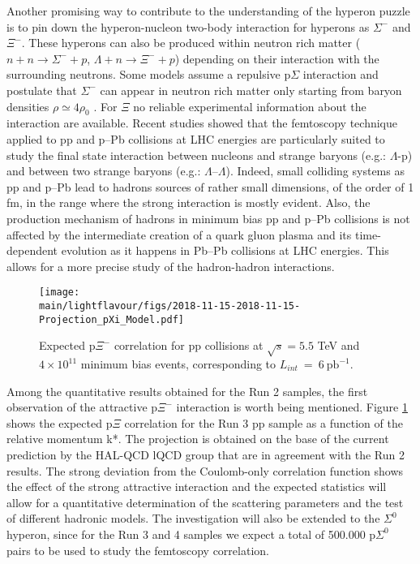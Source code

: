 Another promising way to contribute to the understanding of the hyperon puzzle is to pin down the hyperon-nucleon two-body interaction
for  hyperons as $\Sigma^{-}$ and $\Xi^-$. These hyperons can also be produced within neutron rich matter 
($n+n \rightarrow \Sigma^- + p$, $\Lambda +n \rightarrow \Xi^- +  p$) depending on their interaction with the surrounding neutrons.
Some models assume a repulsive p$\Sigma$ interaction and postulate that $\Sigma^{-}$ can appear in neutron rich matter only starting from baryon densities $\rho \simeq 4\rho_{0}$ \cite{PRC-93-035808-2016}.
For $\Xi$ no reliable experimental information about the interaction are available.
Recent studies \cite{Acharya:2018gyz} showed that the femtoscopy technique applied to  pp and p--Pb collisions at LHC energies are particularly suited to study the final state interaction between nucleons and strange baryons (e.g.: $\Lambda$\--p) and between two strange baryons (e.g.: $\Lambda$--$\Lambda$). 
Indeed, small colliding systems as pp and p--Pb lead to hadrons sources of rather small dimensions, of the order of 1 fm, in the range where the strong interaction is mostly evident.
Also, the production mechanism of hadrons in minimum bias pp and p--Pb collisions is not affected by the intermediate creation of a quark gluon plasma and its time-dependent evolution as it happens in Pb--Pb collisions at LHC energies. This allows for a more precise study of the hadron-hadron interactions.

\begin{figure}
\centering
\texttt{[image: \\main/lightflavour/figs/2018-11-15-2018-11-15-Projection\_pXi\_Model.pdf]}
\caption{Expected p$\Xi^-$ correlation for pp collisions at $\sqrt{s} = 5.5$ TeV and $4\times 10^{11}$ minimum bias events, corresponding to $L_{int}~=~6~\mathrm{pb}^{-1}$.}
\label{pXiProj}
\end{figure}

Among the quantitative results obtained for the Run 2 samples, the first observation of the attractive p$\Xi^-$ interaction is worth being mentioned. 
Figure \ref{pXiProj} 
shows the expected p$\Xi$ correlation for the Run 3 pp sample as a function of the relative momentum k*. 
The projection is obtained on the base of the current prediction by the HAL-QCD lQCD group that are in agreement with the Run 2 results.
The strong deviation from the Coulomb-only correlation function shows the effect of the strong attractive interaction 
and the expected statistics will allow for a quantitative determination of the scattering parameters and the test of different hadronic models.
The investigation will also be extended to the $\Sigma^0$ hyperon, since for the Run 3 and 4 samples we expect a total of 500.000 p$\Sigma^0$ pairs
to be used to study the femtoscopy correlation.

